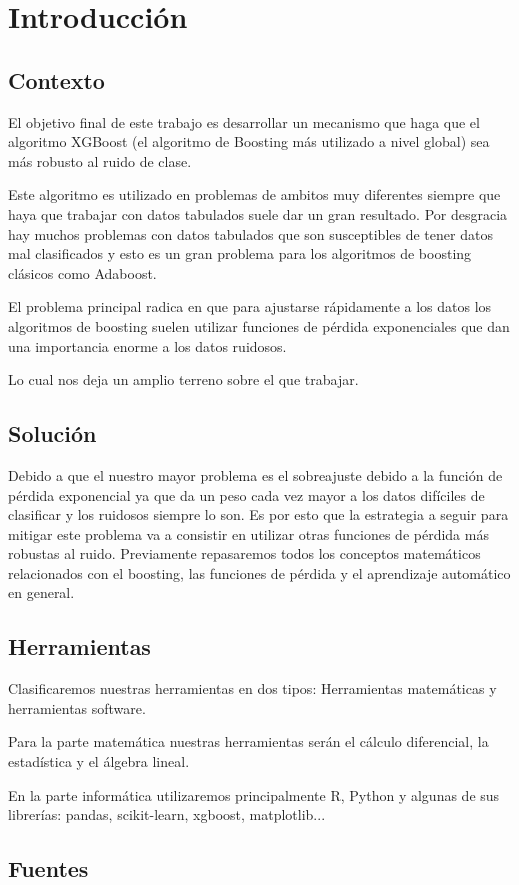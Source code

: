 \chapter{Introducción}

\section{Contexto}

El objetivo final de este trabajo es desarrollar un mecanismo que haga que el algoritmo XGBoost (el algoritmo de Boosting más utilizado a nivel global) sea más robusto al ruido de clase.  

Este algoritmo es utilizado en problemas de ambitos muy diferentes siempre que haya que trabajar con datos tabulados suele dar un gran resultado.  
Por desgracia hay muchos problemas con datos tabulados que son susceptibles de tener datos mal clasificados y esto es un gran problema para los algoritmos de boosting clásicos como Adaboost.  

El problema principal radica en que para ajustarse rápidamente a los datos los algoritmos de boosting suelen utilizar funciones de pérdida exponenciales que dan una importancia enorme a los datos ruidosos. 

Lo cual nos deja un amplio terreno sobre el que trabajar.

\section{Solución}
Debido a que el nuestro mayor problema es el sobreajuste debido a la función de pérdida exponencial ya que da un peso cada vez mayor a los datos difíciles de clasificar y los ruidosos siempre lo son.  
Es por esto que la estrategia a seguir para mitigar este problema va a consistir en utilizar otras funciones de pérdida más robustas al ruido.  
Previamente repasaremos todos los conceptos matemáticos relacionados con el boosting, las funciones de pérdida y el aprendizaje automático en general. 

\section{Herramientas}
Clasificaremos nuestras herramientas en dos tipos: Herramientas matemáticas y herramientas software.  

Para la parte matemática nuestras herramientas serán el cálculo diferencial, la estadística y el álgebra lineal.  

En la parte informática utilizaremos principalmente R, Python y algunas de sus librerías: pandas, scikit-learn, xgboost, matplotlib...

\section{Fuentes}
